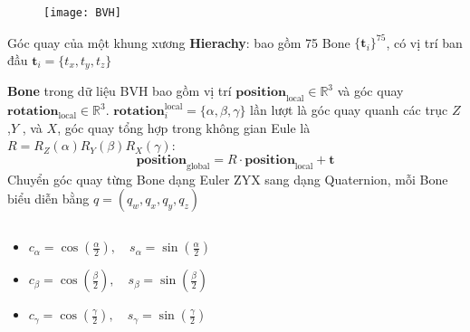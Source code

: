 \begin{frame}
%	
	\begin{figure}
		\centering
		\texttt{[image: BVH]}
	\end{figure}
\end{frame}


\begin{frame}{Góc quay của một khung xương}
	\small
	\textbf{Hierachy}: bao gồm 75 Bone $\{ \mathbf{t}_i \}^{75} $, có vị trí ban đầu  $\mathbf{t}_{i} = \{t_x, t_y, t_z\}$
	
	\vspace{5pt}
	
	\textbf{Bone} trong dữ liệu BVH bao gồm vị trí $\mathbf{position}_{\operatorname{local}}  \in \mathbb{R}^{3}$ và góc quay $\mathbf{rotation}_{\operatorname{local}} \in \mathbb{R}^{3}$.
	$\mathbf{rotation}_i^{\operatorname{local}} = \{ \alpha ,\beta , \gamma \}$ lần lượt là góc quay quanh các trục $Z$ ,$Y$ , và $X$, góc quay tổng hợp trong không gian Eule là $R = R_Z(\alpha) R_Y(\beta) R_X(\gamma)$:
	\begin{equation}
		\mathbf{position}_{\text{global}} = R \cdot \mathbf{position}_{\text{local}} + \mathbf{t}
	\end{equation}
	Chuyển góc quay từng Bone dạng Euler ZYX sang dạng Quaternion, mỗi Bone biểu diễn bằng $q = (q_w, q_x, q_y, q_z)$
	\begin{columns}
		\begin{column}{0.5\textwidth}
			\begin{itemize}
				\item $c_{\alpha} = \cos\left(\frac{\alpha}{2}\right), \quad s_{\alpha} = \sin\left(\frac{\alpha}{2}\right)$
				\item $c_{\beta} = \cos\left(\frac{\beta}{2}\right), \quad s_{\beta} = \sin\left(\frac{\beta}{2}\right)$
				\item $c_{\gamma} = \cos\left(\frac{\gamma}{2}\right), \quad s_{\gamma} = \sin\left(\frac{\gamma}{2}\right)$
			\end{itemize}
		\end{column}
		\begin{column}{0.5\textwidth}
				\begin{itemize}

\end{itemize}
\end{column}
\end{columns}
\end{frame}
